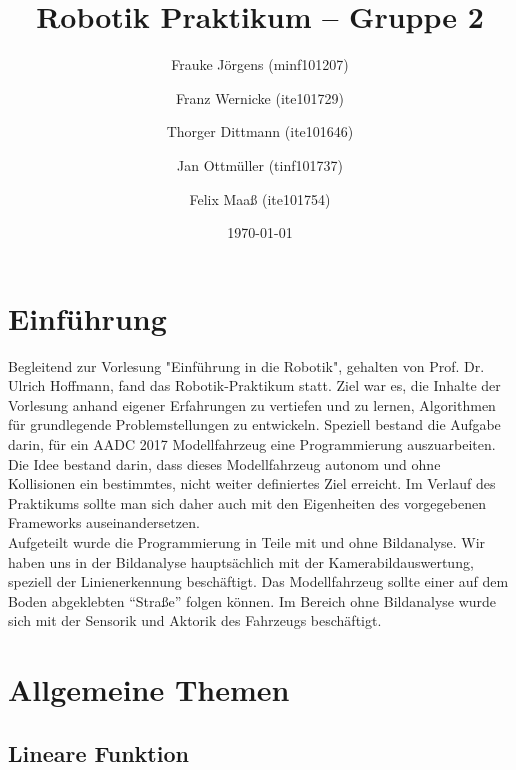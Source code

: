 \documentclass[a4paper,12pt]{report}
\begin{document}
	

	\title{Robotik Praktikum -- Gruppe 2}
	\author{Frauke Jörgens (minf101207) \and Franz Wernicke (ite101729) \and Thorger Dittmann (ite101646) \and Jan Ottmüller (tinf101737) \and Felix Maaß (ite101754)}
	\date{\today}
	\maketitle
	
	\tableofcontents
	


\chapter{Einführung}
    
Begleitend zur Vorlesung "Einführung in die Robotik", gehalten von Prof. Dr. Ulrich Hoffmann, fand das Robotik-Praktikum statt. Ziel war es, die Inhalte der Vorlesung anhand eigener Erfahrungen zu vertiefen und zu lernen, Algorithmen für grundlegende Problemstellungen zu entwickeln. Speziell bestand die Aufgabe darin, für ein AADC 2017 Modellfahrzeug eine Programmierung auszuarbeiten. Die Idee bestand darin, dass dieses Modellfahrzeug autonom und ohne Kollisionen ein bestimmtes, nicht weiter definiertes Ziel erreicht. Im Verlauf des Praktikums sollte man sich daher auch mit den Eigenheiten des vorgegebenen Frameworks auseinandersetzen.\\
Aufgeteilt wurde die Programmierung in Teile mit und ohne Bildanalyse. Wir haben uns in der Bildanalyse hauptsächlich mit der Kamerabildauswertung, speziell der Linienerkennung beschäftigt. Das Modellfahrzeug sollte einer auf dem Boden abgeklebten "`Straße"' folgen können. Im Bereich ohne Bildanalyse wurde sich mit der Sensorik und Aktorik des Fahrzeugs beschäftigt.\\

\chapter{Allgemeine Themen}
\section{Lineare Funktion}

\end{document}
